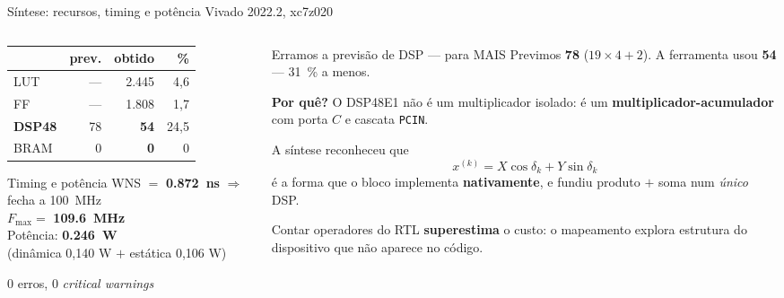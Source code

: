 \documentclass[aspectratio=169, 11pt]{beamer}
\begin{document}
\begin{frame}{Síntese: recursos, timing e potência \hfill \scriptsize Vivado 2022.2, xc7z020}
\begin{columns}[T]
\begin{column}{0.46\textwidth}
\centering
\begin{tabular}{@{}lrrr@{}}
\toprule
 & \scriptsize prev. & \scriptsize obtido & \scriptsize \% \\
\midrule
LUT & --- & 2.445 & 4,6 \\
FF & --- & 1.808 & 1,7 \\
\textbf{DSP48} & 78 & \alert{\textbf{54}} & 24,5 \\
BRAM & 0 & \textbf{0} & 0 \\
\bottomrule
\end{tabular}

\vspace{2mm}
\begin{exampleblock}{\footnotesize Timing e potência}
\centering\footnotesize
WNS $=$ \textbf{\SI{+0.872}{\nano\second}} $\Rightarrow$ \alert{fecha a \SI{100}{\mega\hertz}}\\
$F_{\max} = $ \textbf{\SI{109.6}{\mega\hertz}}\\[1mm]
Potência: \textbf{\SI{0.246}{\watt}}\\
{\scriptsize (dinâmica 0,140 W $+$ estática 0,106 W)}
\end{exampleblock}
\centering\tiny 0 erros, 0 \emph{critical warnings}
\end{column}
\begin{column}{0.54\textwidth}
\begin{alertblock}{Erramos a previsão de DSP --- para MAIS}
\footnotesize
Previmos \textbf{78} ($19\times4 + 2$). A ferramenta usou \textbf{54} --- \SI{31}{\percent} a menos.
\end{alertblock}

\footnotesize
\textbf{Por quê?} O DSP48E1 não é um multiplicador isolado: é um
\textbf{multiplicador-acumulador} com porta $C$ e cascata \texttt{PCIN}.

\vspace{1mm}
A síntese reconheceu que
\[ x^{(k)} = X\cos\delta_k + Y\sin\delta_k \]
é a forma que o bloco implementa \textbf{nativamente}, e fundiu produto $+$ soma
num \emph{único} DSP.

\vspace{2mm}
\alert{\footnotesize Contar operadores do RTL \textbf{superestima} o custo:
o mapeamento explora estrutura do dispositivo que não aparece no código.}
\end{column}
\end{columns}
\end{frame}
\end{document}
